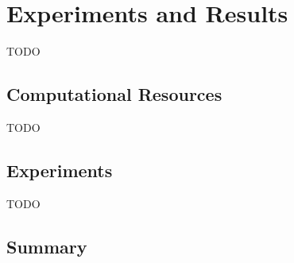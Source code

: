 \documentclass[../chapters.tex]{subfiles}
\begin{document}
    \chapter{Experiments and Results}\label{sec:experiments-and-results}
    TODO


    \section{Computational Resources}\label{sec:computational-resources}
    TODO


    \section{Experiments}\label{sec:experiments}
    TODO



    \section{Summary}\label{sec:summary}
\end{document}
